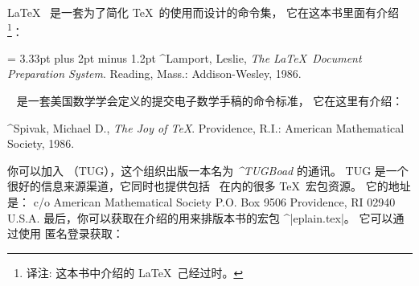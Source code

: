 \LaTeX\  是一套为了简化 \TeX\ 的使用而设计的命令集，
它在这本书里面有介绍\footnote{译注: 这本书中介绍的 \LaTeX\ 己经过时。}：
\smallskip
{\narrower\noindent\frenchspacing\spaceskip = 3.33pt plus 2pt minus 1.2pt
^{Lamport, Leslie}, {\sl The \LaTeX\ Document Preparation System}.
Reading, Mass.: Addison-Wesley, 1986.\par}
\smallskip
\noindent
\AMSTeX\  是一套美国数学学会定义的提交电子数学手稿的命令标准，
它在这里有介绍：
\smallskip
{\narrower\noindent
^{Spivak, Michael D.}, {\sl The Joy of \TeX}. Providence, R.I.:
American Mathematical Society, 1986.
\par}
\smallskip
\noindent
你可以加入 \TeXyhz{}（TUG），这个组织出版一本名为 {\it ^{TUGBoad}} 的通讯。
TUG 是一个很好的信息来源渠道，它同时也提供包括 \AMSTeX\ 在内的很多 \TeX\ 宏包资源。
它的地址是：
\smallskip
{\obeylines
\TeXyhz{}
c/o American Mathematical Society
P.O. Box 9506
Providence,  RI  02940
U.S.A.
}
\smallskip
\noindent
最后，你可以获取在介绍的用来排版本书的宏包 ^|eplain.tex|。
它可以通过使用 \ftp 匿名登录获取：
{\obeylines{}}

